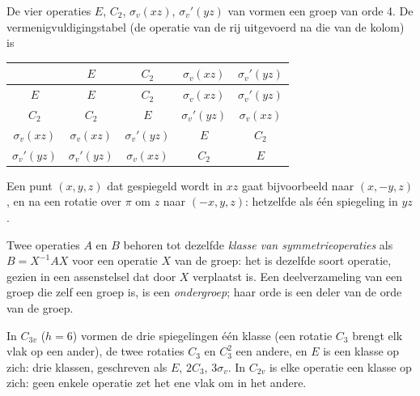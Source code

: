 \begin{example}\label{ex:b3:point-groups:c2v}
De vier operaties $E$, $C_2$, $\sigma_v(xz)$, $\sigma_v'(yz)$ van  vormen een
groep van orde 4. De vermenigvuldigingstabel (de operatie van de rij
uitgevoerd na die van de kolom) is
\begin{center}\small
\begin{tabular}{c|cccc}
\hline
 & $E$ & $C_2$ & $\sigma_v(xz)$ & $\sigma_v'(yz)$\\ \hline
$E$ & $E$ & $C_2$ & $\sigma_v(xz)$ & $\sigma_v'(yz)$\\
$C_2$ & $C_2$ & $E$ & $\sigma_v'(yz)$ & $\sigma_v(xz)$\\
$\sigma_v(xz)$ & $\sigma_v(xz)$ & $\sigma_v'(yz)$ & $E$ & $C_2$\\
$\sigma_v'(yz)$ & $\sigma_v'(yz)$ & $\sigma_v(xz)$ & $C_2$ & $E$\\ \hline
\end{tabular}
\end{center}
Een punt $(x, y, z)$ dat gespiegeld wordt in $xz$ gaat bijvoorbeeld naar $(x, -y, z)$, en
na een rotatie over $\pi$ om $z$ naar $(-x, y, z)$: hetzelfde als één
spiegeling in
$yz$.
\end{example}

\begin{definition}\label{def:b3:point-groups:class}
Twee operaties $A$ en $B$ behoren tot dezelfde \emph{klasse van
symmetrieoperaties} als $B = X^{-1}AX$
voor een operatie $X$ van de groep: het is dezelfde soort operatie, gezien
in een assenstelsel dat door $X$ verplaatst is. Een deelverzameling van
een groep die zelf een groep is, is een
\emph{ondergroep}; haar orde is een deler van de orde van
de groep.
\end{definition}

\begin{example}\label{ex:b3:point-groups:classes}
In $C_{3v}$ ($h = 6$) vormen de drie spiegelingen één klasse (een rotatie
$C_3$ brengt elk vlak op een ander), de twee rotaties $C_3$ en $C_3^2$ een
andere, en $E$ is een klasse op zich: drie klassen, geschreven als $E$, $2C_3$, $3\sigma_v$. In
$C_{2v}$ is elke operatie een klasse op zich: geen enkele operatie zet het
ene vlak om in het andere.
\end{example}

